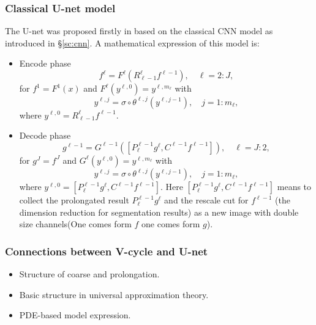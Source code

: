 \subsubsection{Classical U-net model}
The U-net was proposed firstly in \cite{ronneberger2015u} based on the classical CNN model as introduced in \S \ref{sc:cnn}. A mathematical expression of this model is:
\begin{itemize}
	\item Encode phase
	\begin{equation}\label{U-multi-encode-classic}
	f^{\ell} = F^{\ell}(R^{\ell}_{\ell -1} f^{\ell-1}), \quad \ell=2:J,
	\end{equation}
	for $f^1 = F^1(x)$ and
	$F^\ell (y^{\ell,0}) = y^{\ell, m_\ell}$ with 
	\begin{equation}\label{u-eq:gcnnblock}
	y^{\ell, j} = \sigma \circ \theta^{\ell,j}(y^{\ell,j-1}),
	\quad j = 1:m_\ell,
	\end{equation}
	where $y^{\ell,0} =R^{\ell}_{\ell-1} f^{\ell-1}$.
	
	
	\item Decode phase
	\begin{equation}\label{U-multi-decode-classic}
	g^{\ell-1} = G^{\ell-1}([P^{\ell-1}_{\ell}g^{\ell},C^{\ell-1}f^{\ell-1}]), \quad \ell=J:2,
	\end{equation}
	for $g^{J} = f^J$ and $G^\ell (y^{\ell,0}) = y^{\ell, m_\ell}$ with 
	\begin{equation}\label{eq:gcnnblock}
	y^{\ell, j} = \sigma \circ \theta^{\ell,j}(y^{\ell,j-1}),
	\quad j = 1:m_\ell,
	\end{equation}
	where $y^{\ell,0} = [P^{\ell-1}_{\ell}g^{\ell},C^{\ell-1}f^{\ell-1}]$. Here $[P^{\ell-1}_{\ell}g^{\ell},C^{\ell-1}f^{\ell-1}]$ means to collect the prolongated result $P^{\ell-1}_{\ell}g^{\ell}$ and the rescale cut for $f^{\ell-1}$ (the dimension reduction for segmentation results) as a new image with double size channels(One comes form $f$ one comes form $g$). 
\end{itemize}


\subsubsection{Connections between V-cycle and U-net}
\begin{itemize}
	\item Structure of coarse and prolongation.
	\item Basic structure in universal approximation theory.
	\item PDE-based model expression.
\end{itemize}


